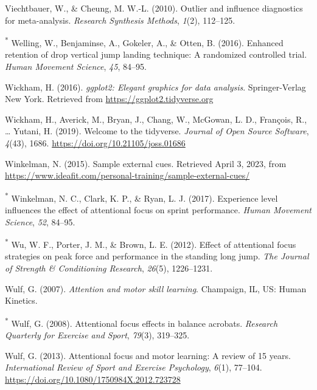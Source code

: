 \documentclass[
  man, donotrepeattitle,floatsintext]{apa7}
\newlength{\cslhangindent}
\newlength{\cslentryspacingunit} %
\newenvironment{CSLReferences}[2] %
 {%
  \setlength{\parindent}{0pt}
  \ifodd #1
  \let\oldpar\par
  \def\par{\hangindent=\cslhangindent\oldpar}
  \fi
  \setlength{\parskip}{#2\cslentryspacingunit}
 }%
 {}
\begin{document}
\begin{CSLReferences}{1}{0}
\leavevmode{}%
Viechtbauer, W., \& Cheung, M. W.-L. (2010). Outlier and influence diagnostics for meta-analysis. \emph{Research Synthesis Methods}, \emph{1}(2), 112--125.

\leavevmode{}%
\textsuperscript{*} Welling, W., Benjaminse, A., Gokeler, A., \& Otten, B. (2016). Enhanced retention of drop vertical jump landing technique: A randomized controlled trial. \emph{Human Movement Science}, \emph{45}, 84--95.

\leavevmode{}%
Wickham, H. (2016). \emph{ggplot2: Elegant graphics for data analysis}. Springer-Verlag New York. Retrieved from \url{https://ggplot2.tidyverse.org}

\leavevmode{}%
Wickham, H., Averick, M., Bryan, J., Chang, W., McGowan, L. D., François, R., \ldots{} Yutani, H. (2019). Welcome to the {tidyverse}. \emph{Journal of Open Source Software}, \emph{4}(43), 1686. \url{https://doi.org/10.21105/joss.01686}

\leavevmode{}%
Winkelman, N. (2015). Sample external cues. Retrieved April 3, 2023, from \url{https://www.ideafit.com/personal-training/sample-external-cues/}

\leavevmode{}%
\textsuperscript{*} Winkelman, N. C., Clark, K. P., \& Ryan, L. J. (2017). Experience level influences the effect of attentional focus on sprint performance. \emph{Human Movement Science}, \emph{52}, 84--95.

\leavevmode{}%
\textsuperscript{*} Wu, W. F., Porter, J. M., \& Brown, L. E. (2012). Effect of attentional focus strategies on peak force and performance in the standing long jump. \emph{The Journal of Strength \& Conditioning Research}, \emph{26}(5), 1226--1231.

\leavevmode{}%
Wulf, G. (2007). \emph{Attention and motor skill learning}. {Champaign, IL, US}: {Human Kinetics}.

\leavevmode{}%
\textsuperscript{*} Wulf, G. (2008). Attentional focus effects in balance acrobats. \emph{Research Quarterly for Exercise and Sport}, \emph{79}(3), 319--325.

\leavevmode{}%
Wulf, G. (2013). Attentional focus and motor learning: A review of 15 years. \emph{International Review of Sport and Exercise Psychology}, \emph{6}(1), 77--104. \url{https://doi.org/10.1080/1750984X.2012.723728}


\end{CSLReferences}
\end{document}

